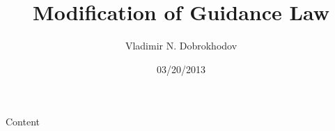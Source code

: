 \documentclass[]{article}
\begin{document}
\title{Modification of Guidance Law}
\author{Vladimir N. Dobrokhodov}
\date{03/20/2013}
\maketitle

Content
\end{document}

